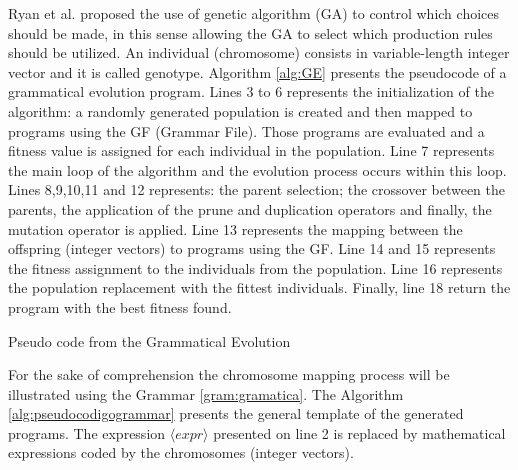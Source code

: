 \documentclass[conference]{IEEEtran}
\begin{document}
Ryan et al. \cite{ryan1998grammatical}  proposed the use of genetic algorithm (GA) to control which choices should be made, in this sense allowing the GA to select which production rules should be utilized. An individual (chromosome) consists in variable-length integer vector and it is called genotype. Algorithm \ref{alg:GE} presents the pseudocode of a grammatical evolution program. Lines 3 to 6 represents the initialization of the algorithm: a randomly generated population is created and then mapped to programs using the GF (Grammar File). Those programs are evaluated and a fitness value is assigned for each individual in the population. Line 7 represents the main loop of the algorithm and the evolution process occurs within this loop. Lines 8,9,10,11 and 12 represents: the parent selection; the crossover between the parents, the application of the prune and duplication operators and finally, the mutation operator is applied. Line 13 represents the mapping between the offspring (integer vectors) to programs using the GF. Line 14 and 15 represents the fitness assignment to the individuals from the population. Line 16 represents the population replacement with the fittest individuals. Finally, line 18 return the program with the best fitness found.


\begin{algorithm}[htb]
	\fontsize{8pt}{10pt}\selectfont
	\caption{Pseudo code from the Grammatical Evolution}
	\label{alg:GE}
\end{algorithm}


For the sake of comprehension the chromosome mapping process will be illustrated using the Grammar \ref{gram:gramatica}. The Algorithm \ref{alg:pseudocodigogrammar} presents the general template of the generated programs. The expression $\langle expr \rangle$ presented on line 2 is replaced by mathematical expressions coded by the chromosomes (integer vectors).
\end{document}
